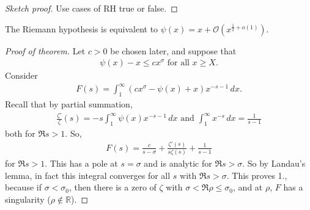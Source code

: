 \documentclass{article}
\newcommand{\1}{\mathbbm{1}}
\newcommand{\bigO}{\mathcal{O}}
\begin{document}
\begin{proof}[Sketch proof]
  Use cases of RH true or false.
\end{proof}
\begin{cor}
  The Riemann hypothesis is equivalent to $\psi(x) = x + \bigO(x^{\frac 12 + o(1)})$.
\end{cor}
\begin{proof}[Proof of theorem]
  Let $c > 0$ be chosen later, and suppose that
  \begin{align*}
    \psi(x) - x \leq c x^\sigma \text{ for all } x \geq X.
  \end{align*}
  Consider
  \begin{align*}
    F(s) = \int_1^\infty (c x^\sigma - \psi(x) + x) x^{-s-1} \,dx.
  \end{align*}
  Recall that by partial summation,
  \begin{align*}
    \frac{\zeta'}{\zeta}(s) = -s \int_1^\infty \psi(x) x^{-s-1}\,dx \text{ and } \int_1^\infty x^{-s}\,dx = \frac1 {s-1}
  \end{align*}
  both for $\Re s > 1$.
  So,
  \begin{align*}
    F(s) = \frac{c}{s-\sigma} + \frac{\zeta'(s)}{s \zeta(s)} + \frac{1}{s-1}
  \end{align*}
  for $\Re s > 1$.
  This has a pole at $s=\sigma$ and is analytic for $\Re s > \sigma$.
  So by Landau's lemma, in fact this integral converges for all $s$ with $\Re s > \sigma$.
  This proves 1., because if $\sigma < \sigma_0$, then there is a zero of $\zeta$ with $\sigma < \Re \rho \leq \sigma_0$, and at $\rho$, $F$ has a singularity ($\rho \notin \mathbb{R}$).


\end{proof}
\end{document}
